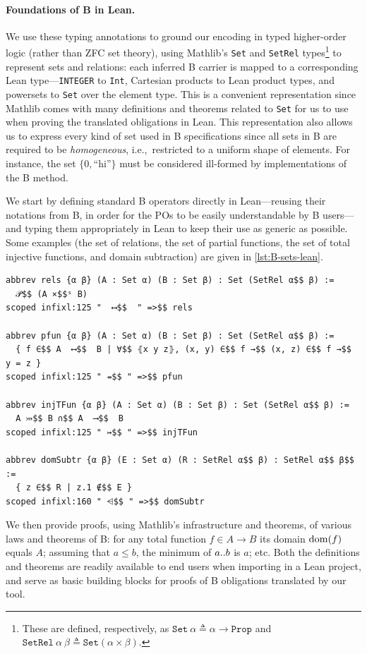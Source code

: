 \paragraph*{Foundations of B in Lean.}
%
We use these typing annotations to ground our encoding in typed higher-order logic (rather than ZFC set theory), using Mathlib's \texttt{Set} and \texttt{SetRel} types\footnote{These are defined, respectively, as $\mathtt{Set}\ \alpha \triangleq \alpha \to \mathtt{Prop}$ and $\mathtt{SetRel}\ \alpha\ \beta \triangleq \mathtt{Set}(\alpha \times \beta)$.} to represent sets and relations:
each inferred B carrier is mapped to a corresponding Lean type---\texttt{INTEGER} to \texttt{Int}, Cartesian products to Lean product types, and powersets to \texttt{Set} over the element type.
This is a convenient representation since Mathlib comes
with many definitions and theorems related to \texttt{Set} for us to use when proving the translated obligations in Lean.
This representation also allows us to express every kind of set used in B specifications since all sets in B are required to be \emph{homogeneous}, i.e.,\ restricted to a uniform shape of elements.
For instance, the set $\{0, \text{``hi''}\}$ must be considered ill-formed by implementations of the B method.

We start by defining standard B operators directly in Lean---reusing their notations from B, in order for the POs to be easily understandable by B users---and typing them appropriately in Lean to keep their use as generic as possible.
Some examples (the set of relations, the set of partial functions, the set of total injective functions, and domain subtraction) are given in \cref{lst:B-sets-lean}.
%
\begin{lstlisting}[label=lst:B-sets-lean, caption={Encoding of some B operators in Lean.}, float=t]
abbrev rels {α β} (A : Set α) (B : Set β) : Set (SetRel α$$ β) :=
  𝒫$$ (A ×$$ˢ B)
scoped infixl:125 "  ⟷$$  " =>$$ rels

abbrev pfun {α β} (A : Set α) (B : Set β) : Set (SetRel α$$ β) :=
  { f ∈$$ A  ⟷$$  B | ∀$$ ⦃x y z⦄, (x, y) ∈$$ f →$$ (x, z) ∈$$ f →$$ y = z }
scoped infixl:125 " ⇸$$ " =>$$ pfun

abbrev injTFun {α β} (A : Set α) (B : Set β) : Set (SetRel α$$ β) :=
  A ⤔$$ B ∩$$ A  ⟶$$  B
scoped infixl:125 " ↣$$ " =>$$ injTFun

abbrev domSubtr {α β} (E : Set α) (R : SetRel α$$ β) : SetRel α$$ β$$ :=
  { z ∈$$ R | z.1 ∉$$ E }
scoped infixl:160 " ⩤$$ " =>$$ domSubtr
\end{lstlisting}
%
We then provide proofs, using Mathlib's infrastructure and theorems, of various laws and theorems of B: for any total function $f \in A \longrightarrow B$ its domain $\operatorname{dom}(f)$ equals $A$; assuming that $a \le b$, the minimum of $a .. b$ is $a$; etc.
Both the definitions and theorems are readily available to end users when importing \barrel in a Lean project, and serve as basic building blocks for proofs of B obligations translated by our tool.



